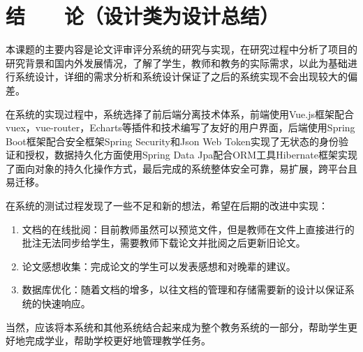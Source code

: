
\chapter*{\hfill 结　　论（设计类为设计总结） \hfill}
\label{conclusion}

本课题的主要内容是论文评审评分系统的研究与实现，在研究过程中分析了项目的研究背景和国内外发展情况，了解了学生，教师和教务的实际需求，以此为基础进行系统设计，详细的需求分析和系统设计保证了之后的系统实现不会出现较大的偏差。

在系统的实现过程中，系统选择了前后端分离技术体系，前端使用Vue.js框架配合vuex，vue-router，Echarts等插件和技术编写了友好的用户界面，后端使用Spring Boot框架配合安全框架Spring Security和Json Web Token实现了无状态的身份验证和授权，数据持久化方面使用Spring Data Jpa配合ORM工具Hibernate框架实现了面向对象的持久化操作方式，最后完成的系统整体安全可靠，易扩展，跨平台且易迁移。

在系统的测试过程发现了一些不足和新的想法，希望在后期的改进中实现：
\begin{enumerate}
    \item 文档的在线批阅：目前教师虽然可以预览文件，但是教师在文件上直接进行的批注无法同步给学生，需要教师下载论文并批阅之后更新旧论文。
    \item 论文感想收集：完成论文的学生可以发表感想和对晚辈的建议。
    \item 数据库优化：随着文档的增多，以往文档的管理和存储需要新的设计以保证系统的快速响应。
\end{enumerate}

当然，应该将本系统和其他系统结合起来成为整个教务系统的一部分，帮助学生更好地完成学业，帮助学校更好地管理教学任务。